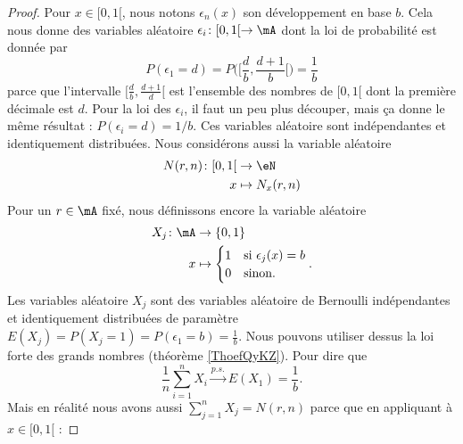 \begin{proof}
    Pour \( x\in\mathopen[ 0 , 1 [\), nous notons \( \epsilon_n(x)\) son développement en base \( b\). Cela nous donne des variables aléatoire \( \epsilon_i\colon \mathopen[ 0 , 1 [\to \mA\) dont la loi de probabilité est donnée par
    \begin{equation}
        P(\epsilon_1=d)=P\big( \mathopen[ \frac{ d }{ b } , \frac{ d+1 }{ b } [ \big)=\frac{1}{ b }
    \end{equation}
    parce que l'intervalle \( \mathopen[ \frac{ d }{ b } , \frac{ d+1 }{ d } [\) est l'ensemble des nombres de \( \mathopen[ 0 , 1 [\) dont la première décimale est \( d\). Pour la loi des \( \epsilon_i\), il faut un peu plus découper, mais ça donne le même résultat : \( P(\epsilon_i=d)=1/b\). Ces variables aléatoire sont indépendantes et identiquement distribuées. Nous considérons aussi la variable aléatoire
    \begin{equation}
        \begin{aligned}
            N(r,n)\colon \mathopen[ 0 , 1 [&\to \eN \\
            x&\mapsto N_x(r,n) 
        \end{aligned}
    \end{equation}
    Pour un \( r\in\mA\) fixé, nous définissons encore la variable aléatoire
    \begin{equation}
        \begin{aligned}
            X_j\colon \mA&\to \{ 0,1 \} \\
            x&\mapsto \begin{cases}
                1    &   \text{si \( \epsilon_j(x)=b\)}\\
                0    &    \text{sinon.}
            \end{cases}.
        \end{aligned}
    \end{equation}
    Les variables aléatoire \( X_j\) sont des variables aléatoire de Bernoulli indépendantes et identiquement distribuées de paramètre \( E(X_j)=P(X_j=1)=P(\epsilon_1=b)=\frac{1}{ b }\). Nous pouvons utiliser dessus la loi forte des grands nombres (théorème \ref{ThoefQyKZ}). Pour dire que
    \begin{equation}    \label{EqNALwzsh}
        \frac{1}{n }\sum_{i=1}^nX_i\stackrel{p.s.}{\longrightarrow}E(X_1)=\frac{1}{ b }.
    \end{equation}
    Mais en réalité nous avons aussi \( \sum_{j=1}^nX_j=N(r,n)\) parce que en appliquant à \( x\in\mathopen[ 0 , 1 [\) :

\end{proof}
